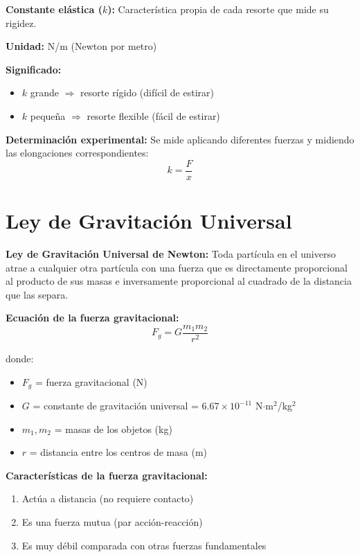 \begin{seccion}

\begin{defincion}
    \textbf{Constante elástica ($k$):} Característica propia de cada resorte que mide su rigidez.
\end{defincion}

\textbf{Unidad:} N/m (Newton por metro)

\textbf{Significado:}
\begin{itemize}
    \item $k$ grande $\Rightarrow$ resorte rígido (difícil de estirar)
    \item $k$ pequeña $\Rightarrow$ resorte flexible (fácil de estirar)
\end{itemize}

\textbf{Determinación experimental:} Se mide aplicando diferentes fuerzas y midiendo las elongaciones correspondientes:
$$k = \frac{F}{x}$$
\end{seccion}

\newpage
\section{Ley de Gravitación Universal}

\begin{seccion}
\begin{defincion}
    \textbf{Ley de Gravitación Universal de Newton:} Toda partícula en el universo atrae a cualquier otra partícula con una fuerza que es directamente proporcional al producto de sus masas e inversamente proporcional al cuadrado de la distancia que las separa.
\end{defincion}

\begin{ecuacion}
\textbf{Ecuación de la fuerza gravitacional:}
$$F_g = G\frac{m_1 m_2}{r^2}$$

donde:
\begin{itemize}
    \item $F_g$ = fuerza gravitacional (N)
    \item $G$ = constante de gravitación universal = $6.67 \times 10^{-11}$ N$\cdot$m$^2$/kg$^2$
    \item $m_1, m_2$ = masas de los objetos (kg)
    \item $r$ = distancia entre los centros de masa (m)
\end{itemize}
\end{ecuacion}

\textbf{Características de la fuerza gravitacional:}
\begin{enumerate}
    \item Actúa a distancia (no requiere contacto)
    \item Es una fuerza mutua (par acción-reacción)
    \item Es muy débil comparada con otras fuerzas fundamentales
\end{enumerate}
\end{seccion}

